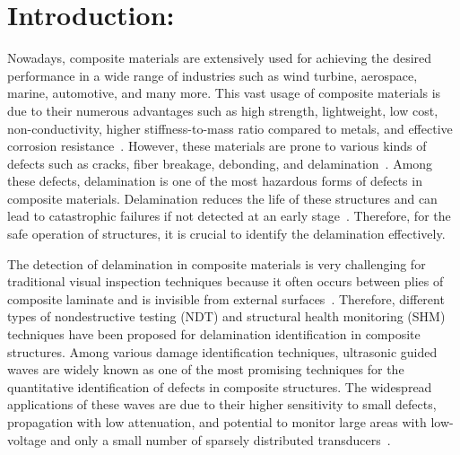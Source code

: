 \section{Introduction:}

Nowadays, composite materials are extensively used for achieving the desired performance in a wide range of industries such as wind turbine, aerospace, marine, automotive, and many more.
This vast usage of composite materials is due to their numerous advantages such as high strength, lightweight, low cost, non-conductivity, higher stiffness-to-mass ratio compared to metals, and effective corrosion resistance~\cite{giurgiutiu2015structural, stoik2010nondestructive, poudel2015comparison}. %
However, these materials are prone to various kinds of defects such as cracks, fiber breakage, debonding, and delamination~\cite{poudel2015comparison, talreja2012damage}. %
Among these defects, delamination is one of the most hazardous forms of defects in composite materials. 
Delamination reduces the life of these structures and can lead to catastrophic failures if not detected at an early stage~\cite{talreja2012damage, wisnom2012role}.
Therefore, for the safe operation of structures, it is crucial to identify the delamination effectively.

The detection of delamination in composite materials is very challenging for traditional visual inspection techniques because it often occurs between plies of composite laminate and is invisible from external surfaces~\cite{staszewski2009health, tuo2019damage}. 
Therefore, different types of nondestructive testing (NDT) and structural health monitoring (SHM) techniques have been proposed for delamination identification in composite structures.
Among various damage identification techniques, ultrasonic guided waves are widely known as one of the most promising techniques for the quantitative identification of defects in composite structures.
The widespread applications of these waves are due to their higher sensitivity 
to small defects, propagation with low attenuation, and potential to monitor 
large areas with low-voltage and only a small number of sparsely distributed 
transducers~\cite{Barthorpe2020, Ihn2008, Cantero-Chinchilla2020}. 


